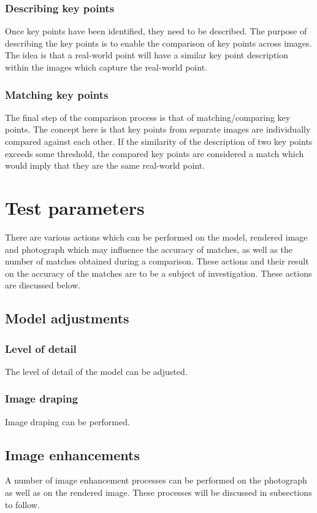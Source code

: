 \documentclass[11pt,a4paper]{report}
\begin{document}
				\subsubsection{Describing key points}
					Once key points have been identified, they need to be described. The purpose of describing the key points is to enable the comparison of key points across images. The idea is that a real-world point will have a similar key point description within the images which capture the real-world point.
					
				\subsubsection{Matching key points}
					The final step of the comparison process is that of matching/comparing key points. The concept here is that key points from separate images are individually compared against each other. If the similarity of the description of two key points exceeds some threshold, the compared key points are considered a match which would imply that they are the same real-world point.

		\section{Test parameters}
			There are various actions which can be performed on the model, rendered image and photograph which may influence the accuracy of matches, as well as the number of matches obtained during a comparison. These actions and their result on the accuracy of the matches are to be a subject of investigation. These actions are discussed below.
			
			\subsection{Model adjustments}
				\subsubsection{Level of detail}
					The level of detail of the model can be adjusted.
					
				\subsubsection{Image draping}
					Image draping can be performed.
					
				
			\subsection{Image enhancements}
				A number of image enhancement processes can be performed on the photograph as well as on the rendered image. These processes will be discussed in subsections to follow.
\end{document}
